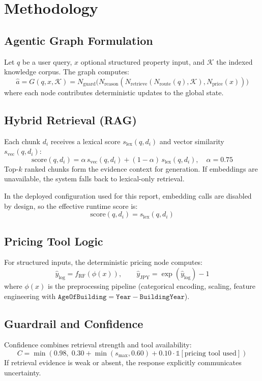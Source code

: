 \documentclass[12pt,a4paper]{article}
\begin{document}
\section{Methodology}
\subsection{Agentic Graph Formulation}
Let $q$ be a user query, $x$ optional structured property input, and $\mathcal{K}$ the indexed knowledge corpus. The graph computes:
\[
\hat{a} = G(q, x, \mathcal{K}) = N_{\text{guard}}\Big(N_{\text{reason}}(N_{\text{retrieve}}(N_{\text{route}}(q), \mathcal{K}), N_{\text{price}}(x))\Big)
\]
where each node contributes deterministic updates to the global state.

\subsection{Hybrid Retrieval (RAG)}
Each chunk $d_i$ receives a lexical score $s_{\text{lex}}(q,d_i)$ and vector similarity $s_{\text{vec}}(q,d_i)$:
\[
\text{score}(q,d_i) = \alpha\, s_{\text{vec}}(q,d_i) + (1-\alpha)\, s_{\text{lex}}(q,d_i), \quad \alpha=0.75
\]
Top-$k$ ranked chunks form the evidence context for generation. If embeddings are unavailable, the system falls back to lexical-only retrieval.

In the deployed configuration used for this report, embedding calls are disabled by design, so the effective runtime score is:
\[
\text{score}(q,d_i) = s_{\text{lex}}(q,d_i)
\]

\subsection{Pricing Tool Logic}
For structured inputs, the deterministic pricing node computes:
\[
\hat{y}_{\log} = f_{\text{RF}}(\phi(x)), \qquad
\hat{y}_{\text{JPY}} = \exp(\hat{y}_{\log}) - 1
\]
where $\phi(x)$ is the preprocessing pipeline (categorical encoding, scaling, feature engineering with $\texttt{AgeOfBuilding} = \texttt{Year} - \texttt{BuildingYear}$).

\subsection{Guardrail and Confidence}
Confidence combines retrieval strength and tool availability:
\[
C = \min\left(0.98,\;0.30 + \min(s_{\max},0.60) + 0.10\cdot\mathbb{1}[\text{pricing tool used}]\right)
\]
If retrieval evidence is weak or absent, the response explicitly communicates uncertainty.
\end{document}

